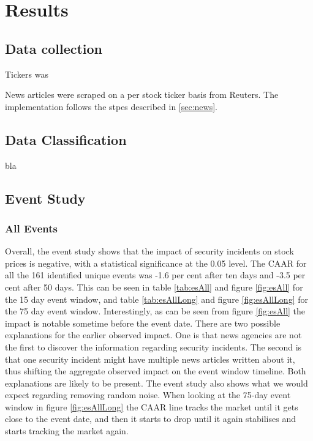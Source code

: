 \chapter{Results}
\label{chap:result}

\section{Data collection}
Tickers was 

News articles were scraped on a per stock ticker basis from Reuters. The implementation follows the stpes described in \ref{sec:news}. 

\section{Data Classification}
bla

\section{Event Study}
\subsection{All Events}
Overall, the event study shows that the impact of security incidents on stock prices is negative, with a statistical significance at the 0.05 level. The CAAR for all the 161 identified unique events was -1.6 per cent after ten days and -3.5 per cent after 50 days. This can be seen in table \ref{tab:esAll} and figure \ref{fig:esAll} for the 15 day event window, and table \ref{tab:esAllLong} and figure \ref{fig:esAllLong} for the 75 day event window. Interestingly, as can be seen from figure \ref{fig:esAll} the impact is notable sometime before the event date. There are two possible explanations for the earlier observed impact. One is that news agencies are not the first to discover the information regarding security incidents. The second is that one security incident might have multiple news articles written about it, thus shifting the aggregate observed impact on the event window timeline. Both explanations are likely to be present. The event study also shows what we would expect regarding removing random noise. When looking at the 75-day event window in figure \ref{fig:esAllLong} the CAAR line tracks the market until it gets close to the event date, and then it starts to drop until it again stabilises and starts tracking the market again.


